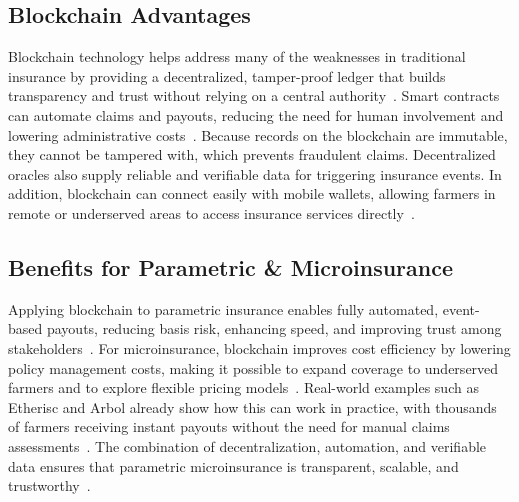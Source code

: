 \documentclass[11pt,a4paper]{article}
\begin{document}
    \subsection{Blockchain Advantages}\label{subsec:blockchain-advantages}
    Blockchain technology helps address many of the weaknesses in traditional insurance by providing a decentralized, tamper-proof ledger that builds transparency and trust without relying on a central authority~\parencite{Shetty2022}.
    Smart contracts can automate claims and payouts, reducing the need for human involvement and lowering administrative costs~\parencite{Chainlink2021, DominguezAnguianoParte2024}.
    Because records on the blockchain are immutable, they cannot be tampered with, which prevents fraudulent claims.
    Decentralized oracles also supply reliable and verifiable data for triggering insurance events.
    In addition, blockchain can connect easily with mobile wallets, allowing farmers in remote or underserved areas to access insurance services directly~\parencite{DominguezAnguianoParte2024}.

    \subsection{Benefits for Parametric \& Microinsurance}\label{subsec:benefits-for-parametric-&-microinsurance}
    Applying blockchain to parametric insurance enables fully automated, event-based payouts, reducing basis risk, enhancing speed, and improving trust among stakeholders~\parencite{Chainlink2021, ParametricInsured2025, Shetty2022}.
    For microinsurance, blockchain improves cost efficiency by lowering policy management costs, making it possible to expand coverage to underserved farmers and to explore flexible pricing models~\parencite{DominguezAnguianoParte2024, ResearchGate2023}.
    Real-world examples such as Etherisc and Arbol already show how this can work in practice, with thousands of farmers receiving instant payouts without the need for manual claims assessments~\parencite{Alsdorf2024, DominguezAnguianoParte2024, ParametricInsured2025}.
    The combination of decentralization, automation, and verifiable data ensures that parametric microinsurance is transparent, scalable, and trustworthy~\parencite{Shetty2022}.
\end{document}
